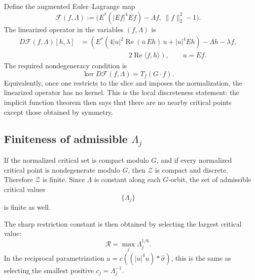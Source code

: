\documentclass[12pt]{article}
\begin{document}
Define the augmented Euler--Lagrange map
\[
  \mathcal F(f,\Lambda)
  :=
  \bigl(E^*(|Ef|^4Ef)-\Lambda f,\ \|f\|_2^2-1\bigr).
\]
The linearized operator in the variables $(f,\Lambda)$ is
\[
  \begin{aligned}
  D\mathcal F(f,\Lambda)[h,\lambda]
  &=
  \left(
    E^*\!\left(4|u|^2\operatorname{Re}(\overline u\,Eh)\,u
        + |u|^4Eh\right)
    -\Lambda h-\lambda f,\right.\\
  &\hspace{7em}\left.
    2\operatorname{Re}\langle f,h\rangle
  \right),
  \qquad u=Ef.
  \end{aligned}
\]
The required nondegeneracy condition is
\[
  \ker D\mathcal F(f,\Lambda)=T_f(G\cdot f).
\]
Equivalently, once one restricts to the slice and imposes the normalization,
the linearized operator has no kernel. This is the local discreteness
statement: the implicit function theorem then says that there are no nearby
critical points except those obtained by symmetry.

\subsection{Finiteness of admissible \texorpdfstring{$\Lambda_j$}{Lambda j}}

If the normalized critical set is compact modulo $G$, and if every normalized
critical point is nondegenerate modulo $G$, then $\mathcal Z$ is compact and
discrete. Therefore $\mathcal Z$ is finite. Since $\Lambda$ is constant along
each $G$-orbit, the set of admissible critical values
\[
  \{\Lambda_j\}
\]
is finite as well.

The sharp restriction constant is then obtained by selecting the largest
critical value:
\[
  \mathcal R=\max_j \Lambda_j^{1/6}.
\]
In the reciprocal parametrization
$u=c((|u|^4u)*\widehat\sigma)$, this is the same as selecting the smallest
positive $c_j=\Lambda_j^{-1}$.
\end{document}
